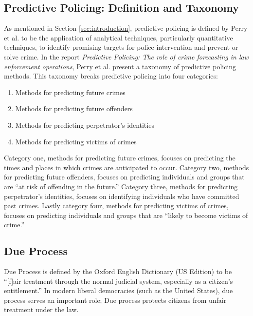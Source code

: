 \documentclass[12pt]{article} %
\newcommand{\hlfixme}[1]{\fxfatal{\hl{#1}}}
\begin{document}
\subsection{Predictive Policing: Definition and Taxonomy} \label{subsec:predictivepolicing}%

As mentioned in Section \ref{sec:introduction}, predictive policing is defined by Perry et al. to be the application of analytical techniques, particularly quantitative techniques, to identify promising targets for police intervention and prevent or solve crime. In the report \textit{Predictive Policing: The role of crime forecasting in law enforcement operations}, Perry et al. present a taxonomy of predictive policing methods. This taxonomy breaks predictive policing into four categories: \cite{perryetal}

\begin{enumerate}
\item Methods for predicting future crimes
\item Methods for predicting future offenders
\item Methods for predicting perpetrator's identities
\item Methods for predicting victims of crimes
\end{enumerate}

Category one, methods for predicting future crimes, focuses on predicting the times and places in which crimes are anticipated to occur. Category two, methods for predicting future offenders, focuses on predicting individuals and groups that are ``at risk of offending in the future.'' Category three, methods for predicting perpetrator's identities, focuses on identifying individuals who have committed past crimes. Lastly category four, methods for predicting victims of crimes, focuses on predicting individuals and groups that are ``likely to become victims of crime.''

\subsection{Due Process} \label{subsec:dueprocess}
Due Process is defined by the Oxford English Dictionary (US Edition) to be ``[f]air treatment through the normal judicial system, especially as a citizen’s entitlement.'' In modern liberal democracies (such as the United States), due process serves an important role; Due process protects citizens from unfair treatment under the law. 
\end{document}
